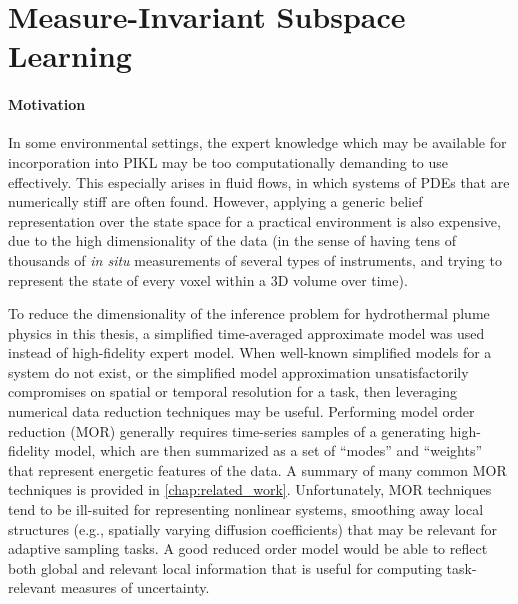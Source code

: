 \section{Measure-Invariant Subspace Learning}
\paragraph{Motivation}
In some environmental settings, the expert knowledge which may be available for incorporation into PIKL may be too computationally demanding to use effectively.
This especially arises in fluid flows, in which systems of PDEs that are numerically stiff are often found.
However, applying a generic belief representation over the state space for a practical environment is also expensive, due to the high dimensionality of the data (in the sense of having tens of thousands of \emph{in situ} measurements of several types of instruments, and trying to represent the state of every voxel within a 3D volume over time).

To reduce the dimensionality of the inference problem for hydrothermal plume physics in this thesis, a simplified time-averaged approximate model was used instead of high-fidelity expert model. 
When well-known simplified models for a system do not exist, or the simplified model approximation unsatisfactorily compromises on spatial or temporal resolution for a task, then leveraging numerical data reduction techniques may be useful.
Performing model order reduction (MOR) generally requires time-series samples of a generating high-fidelity model, which are then summarized as a set of ``modes'' and ``weights'' that represent energetic features of the data.
A summary of many common MOR techniques is provided in \cref{chap:related_work}.
Unfortunately, MOR techniques tend to be ill-suited for representing nonlinear systems, smoothing away local structures (e.g., spatially varying diffusion coefficients) that may be relevant for adaptive sampling tasks.
A good reduced order model would be able to reflect both global and relevant local information that is useful for computing task-relevant measures of uncertainty.

